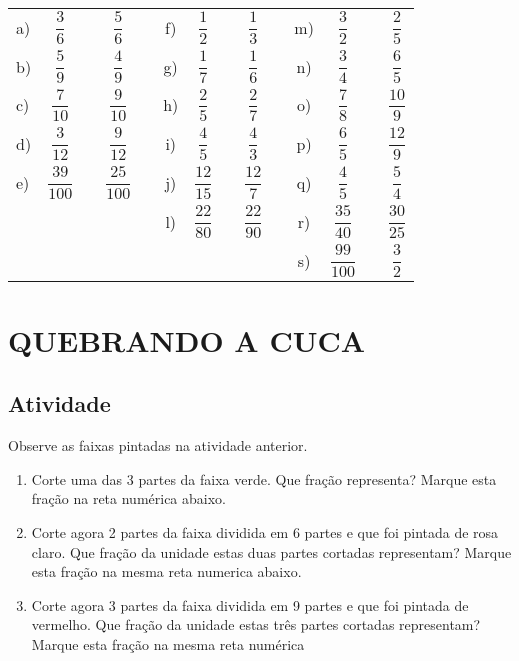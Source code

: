 \documentclass[a4,12pt]{book}
\begin{document}
\begin{center}
\begin{tabular}{lccccccccccccc}
 a)  &  $\dfrac{3}{6}$     &   &  $\dfrac{5}{6}$   & \parbox[t][.6cm]{2cm}{ } \quad \quad\quad  & f)  &  $\dfrac{1}{2}$     &   &  $\dfrac{1}{3}$    & \quad \quad\quad  & m)  &  $\dfrac{3}{2}$     &   &  $\dfrac{2}{5}$    \\
 b)  &  $\dfrac{5}{9}$     &   &  $\dfrac{4}{9}$   & \parbox[t][.6cm]{2cm}{ }    & g)  &  $\dfrac{1}{7}$     &   &  $\dfrac{1}{6}$    &   & n)  &  $\dfrac{3}{4}$     &   &  $\dfrac{6}{5}$    \\
 c)  &  $\dfrac{7}{10}$    &   &  $\dfrac{9}{10}$   & \parbox[t][.6cm]{2cm}{ }   & h)  &  $\dfrac{2}{5}$     &   &  $\dfrac{2}{7}$    &   & o)  &  $\dfrac{7}{8}$     &   &  $\dfrac{10}{9}$   \\
 d)  &  $\dfrac{3}{12}$    &   &  $\dfrac{9}{12}$   & \parbox[t][.6cm]{2cm}{ }   & i)  &  $\dfrac{4}{5}$     &   &  $\dfrac{4}{3}$    &   & p)  &  $\dfrac{6}{5}$     &   &  $\dfrac{12}{9}$   \\
 e)  &  $\dfrac{39}{100}$  &   &  $\dfrac{25}{100}$ & \parbox[t][.6cm]{2cm}{ }   & j)  &  $\dfrac{12}{15}$   &   &  $\dfrac{12}{7}$   &   & q)  &  $\dfrac{4}{5}$     &   &  $\dfrac{5}{4}$    \\
     &&                     &    &                  \parbox[t][.6cm]{2cm}{ }    &  l)  &  $\dfrac{22}{80}$   &   &  $\dfrac{22}{90}$  &   & r)  &  $\dfrac{35}{40}$   &   &  $\dfrac{30}{25}$  \\
     &&                      &    &                    &      &  \parbox[t][.6cm]{2cm}{ }                    &   &                   &   &  s)  &  $\dfrac{99}{100}$  &   &  $\dfrac{3}{2}$    \\
\end{tabular} 
 \end{center}
 
\section{QUEBRANDO A CUCA }


\subsection{Atividade}

Observe as faixas pintadas na atividade anterior. 

\begin{enumerate} [\quad a)] %
  \item     Corte uma das 3 partes da faixa verde. Que fração representa? Marque esta fração na reta numérica abaixo.
  \item     Corte agora 2 partes da faixa dividida em 6 partes e que foi pintada de rosa claro. Que fração da unidade estas duas partes cortadas representam? Marque esta fração na mesma reta numerica abaixo.
  \item     Corte agora 3 partes da faixa dividida em 9 partes e que foi pintada de vermelho. Que fração da unidade estas três partes cortadas representam? Marque esta fração na mesma reta numérica
\end{enumerate} %
\end{document}

